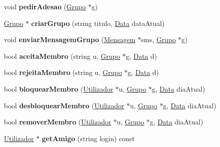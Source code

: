 \begin{DoxyCompactItemize}
\item 
\hypertarget{class_utilizador_aba7f8c8306ae34617d5af06678a8cd12}{}void {\bfseries pedir\+Adesao} (\hyperlink{class_grupo}{Grupo} $\ast$g)\label{class_utilizador_aba7f8c8306ae34617d5af06678a8cd12}

\item 
\hypertarget{class_utilizador_a68471f49e5980a4bf43d48b7ce2118a3}{}\hyperlink{class_grupo}{Grupo} $\ast$ {\bfseries criar\+Grupo} (string titulo, \hyperlink{class_data}{Data} data\+Atual)\label{class_utilizador_a68471f49e5980a4bf43d48b7ce2118a3}

\item 
\hypertarget{class_utilizador_af58be0db512c246659d4fc5210bdc081}{}void {\bfseries enviar\+Mensagem\+Grupo} (\hyperlink{class_mensagem}{Mensagem} $\ast$sms, \hyperlink{class_grupo}{Grupo} $\ast$g)\label{class_utilizador_af58be0db512c246659d4fc5210bdc081}

\item 
\hypertarget{class_utilizador_ab14fba96c23d0b6e10fe3c36c80490c7}{}bool {\bfseries aceita\+Membro} (string u, \hyperlink{class_grupo}{Grupo} $\ast$g, \hyperlink{class_data}{Data} d)\label{class_utilizador_ab14fba96c23d0b6e10fe3c36c80490c7}

\item 
\hypertarget{class_utilizador_ab55a0e6e25616dac0a31ec6e103a987d}{}bool {\bfseries rejeita\+Membro} (string u, \hyperlink{class_grupo}{Grupo} $\ast$g, \hyperlink{class_data}{Data} d)\label{class_utilizador_ab55a0e6e25616dac0a31ec6e103a987d}

\item 
\hypertarget{class_utilizador_a70f4f75f649f4ca5aefebc99e556a20b}{}bool {\bfseries bloquear\+Membro} (\hyperlink{class_utilizador}{Utilizador} $\ast$u, \hyperlink{class_grupo}{Grupo} $\ast$g, \hyperlink{class_data}{Data} dia\+Atual)\label{class_utilizador_a70f4f75f649f4ca5aefebc99e556a20b}

\item 
\hypertarget{class_utilizador_a7424cd944ea535338280e821666768f7}{}bool {\bfseries desbloquear\+Membro} (\hyperlink{class_utilizador}{Utilizador} $\ast$u, \hyperlink{class_grupo}{Grupo} $\ast$g, \hyperlink{class_data}{Data} dia\+Atual)\label{class_utilizador_a7424cd944ea535338280e821666768f7}

\item 
\hypertarget{class_utilizador_a05e62bd42a3e3a324cea8d9c998c2391}{}bool {\bfseries remover\+Membro} (\hyperlink{class_utilizador}{Utilizador} $\ast$u, \hyperlink{class_grupo}{Grupo} $\ast$g, \hyperlink{class_data}{Data} dia\+Atual)\label{class_utilizador_a05e62bd42a3e3a324cea8d9c998c2391}

\item 
\hypertarget{class_utilizador_a13a11370779713c7de00ea62f5c3799b}{}\hyperlink{class_utilizador}{Utilizador} $\ast$ {\bfseries get\+Amigo} (string login) const \label{class_utilizador_a13a11370779713c7de00ea62f5c3799b}

\end{DoxyCompactItemize}
